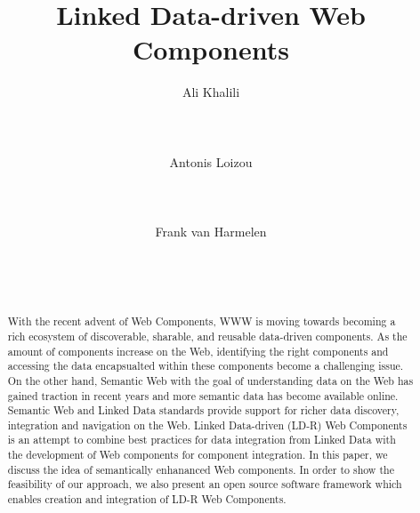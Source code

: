 \documentclass{acm_proc_article-sp}
\begin{document}
\title{Linked Data-driven Web Components}
\subtitle{}

\author{
\alignauthor
Ali Khalili\\
       \\
       \\
       \\
\alignauthor
Antonis Loizou\\
       \\
       \\
       \\
\alignauthor
Frank van Harmelen\\
       \\
       \\
       \\
}


\maketitle
\begin{abstract}
With the recent advent of Web Components, WWW is moving towards becoming a rich ecosystem of discoverable, sharable, and reusable data-driven components.
As the amount of components increase on the Web, identifying the right components and accessing the data encapsualted within these components become a challenging issue.
On the other hand, Semantic Web with the goal of understanding data on the Web has gained traction in recent years and more semantic data has become available online. 
Semantic Web and Linked Data standards provide support for richer data discovery, integration and navigation on the Web.
Linked Data-driven (LD-R) Web Components is an attempt to combine best practices for data integration from Linked Data with the development of Web components for component integration.
In this paper, we discuss the idea of semantically enhananced Web components.
In order to show the feasibility of our approach, we also present an open source software framework which enables creation and integration of LD-R Web Components.

\end{abstract}
\end{document}
